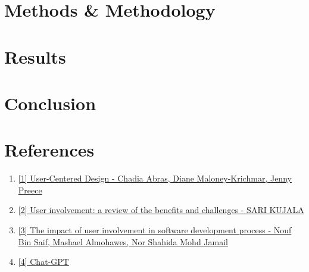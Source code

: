 \documentclass[runningheads]{llncs}
\begin{document}
\section{Methods \& Methodology}

\section{Results}

\section{Conclusion}

\section{References}
\begin{enumerate}
  \item \href{https://www.academia.edu/1012299/User_centered_design} {[1] User-Centered Design - Chadia Abras, Diane Maloney-Krichmar, Jenny Preece}
  \item \href{https://www.researchgate.net/publication/220208710_User_involvement_A_review_of_the_benefits_and_challenges} {[2] User involvement: a review of the benefits and challenges - SARI KUJALA}
  \item \href{https://www.researchgate.net/publication/348292073_The_impact_of_user_involvement_in_software_development_process} {[3] The impact of user involvement in software development process - Nouf Bin Saif, Mashael Almohawes, Nor Shahida Mohd Jamail }
  \item \href{https://chat.openai.com/ } {[4] Chat-GPT}

‌
‌

\end{enumerate}
\end{document}
